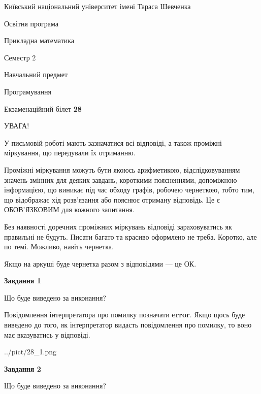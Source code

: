 \documentclass[12pt, ukrainian]{article}
\begin{document}
{{\begin {small}\par
{ \center  Київський національний університет імені Тараса Шевченка \par}
{\parbox {5 cm}{Освітня програма \hfill}{\parbox {7 cm}{Прикладна математика \hfill}}\parbox {6 cm}{\hfill Семестр 2}}\par
{\parbox {5 cm} {Навчальний предмет \hfill}\parbox {7 cm}{Програмування \hfill}\parbox {6cm}{\hfill}\par}\vspace{-7pt} \end{small}}{\center Екзаменаційний білет \No \textbf
{ 28 }\par}}
{
\begin {large}
УВАГА!

У письмовій роботі мають зазначатися всі відповіді, а також проміжні міркування, що передували їх отриманню.

Проміжні міркування можуть бути якоюсь арифметикою, відслідковуванням зна\-чень змінних для деяких завдань,
короткими поясненнями, допоміжною інформацією, що виникає під час обходу графів, робочею чернеткою,
тобто тим, що відображає хід розв’язання або пояснює отриману відповідь.
Це є ОБОВ’ЯЗКОВИМ для кожного запитання.

Без наявності доречних проміжних міркувань відповіді зараховуватись як правиль\-ні не будуть.
Писати багато та красиво оформлено не треба. Коротко, але по темі. Можли\-во, навіть чернетка.

Якщо на аркуші буде чернетка разом з відповідями --- це ОК.

\newpage

{\begin {center}\textbf{Завдання 1}\end {center}}\par
Що буде виведено за виконання?

Повідомлення інтерпретатора про помилку позначати \textbf{error}.
Якщо щось буде виведено до того, як інтерпретатор видасть повідомлення про помилку, 
то воно має вказуватись у відповіді. \par


\begin{center}
	{../pict/28_1.png}
\end{center}
\newpage

{\begin {center}\textbf{Завдання 2}\end {center}}\par
Що буде виведено за виконання?


\end{large}}
\end{document}

